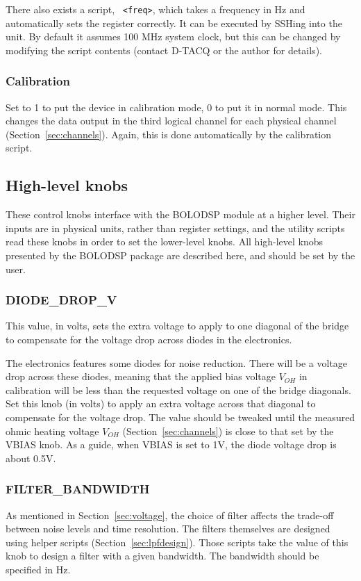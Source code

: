\documentclass[12pt,a4paper]{article}
\begin{document}
There also exists a script, ~\texttt{<freq>}, which takes a frequency in Hz and automatically sets the register
correctly. It can be executed by SSHing into the unit. By default it assumes 100 MHz system clock, but this can be changed by modifying the script
contents (contact D-TACQ or the author for details).

\subsubsection{Calibration}
Set to 1 to put the device in calibration mode, 0 to put it in normal mode. This changes the data output in the third logical channel for each physical
channel (Section~\ref{sec:channels}). Again, this is done automatically by the calibration script.

\subsection{High-level knobs}
\label{sec:knobshl}
These control knobs interface with the BOLODSP module at a higher level. Their inputs are in physical units, rather than register settings, and the
utility scripts read these knobs in order to set the lower-level knobs. All high-level knobs presented by the BOLODSP package are described here, and
should be set by the user.

\subsubsection{DIODE{\_}DROP{\_}V}
This value, in volts, sets the extra voltage to apply to one diagonal of the bridge to compensate for the voltage drop across diodes in the electronics.

The electronics features some diodes for noise reduction. There will be a voltage drop across these diodes, meaning that the applied bias voltage $V_{OH}$
in calibration will be less than the requested voltage on one of the bridge diagonals. Set this knob (in volts) to apply an extra voltage across that
diagonal to compensate for the voltage drop. The value should be tweaked until the measured ohmic heating voltage $V_{OH}$ (Section~\ref{sec:channels}) is
close to that set by the VBIAS knob. As a guide, when VBIAS is set to 1V, the diode voltage drop is about 0.5V.

\subsubsection{FILTER{\_}BANDWIDTH}
As mentioned in Section~\ref{sec:voltage}, the choice of filter affects the trade-off between noise levels and time resolution. The filters themselves are
designed using helper scripts (Section~\ref{sec:lpfdesign}). Those scripts take the value of this knob to design a filter with a given bandwidth. The
bandwidth should be specified in Hz.
\end{document}
